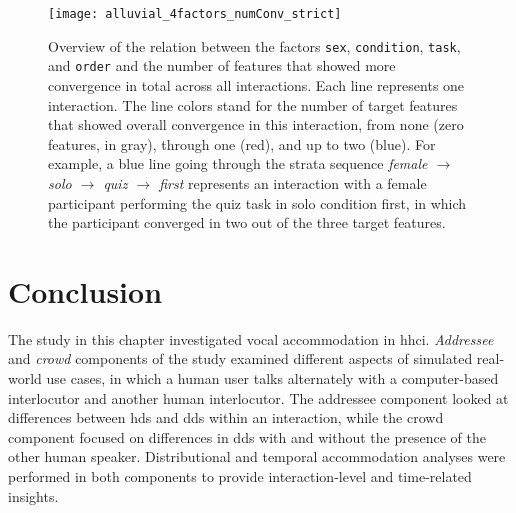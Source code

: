 \begin{figure}[!t]
	\vspace{-0.5cm}
	\centering
	\texttt{[image: alluvial\_4factors\_numConv\_strict]}
	\caption[Number of features showing convergence categorized by factor]
		{Overview of the relation between the factors \texttt{sex}, \texttt{condition}, \texttt{task}, and \texttt{order} and the number of features that showed more convergence in total across all interactions.
		Each line represents one interaction.
		The line colors stand for the number of target features that showed overall convergence in this interaction, from none (zero features, in gray), through one (red), and up to two (blue).
		For example, a blue line going through the strata sequence \emph{female $\rightarrow$ solo $\rightarrow$ quiz $\rightarrow$ first} represents an interaction with a female participant performing the quiz task in solo condition first, in which the participant converged in two out of the three target features.}
	\label{fig:alluvial}
\end{figure}
%
\section{Conclusion}
\label{sec:discussion_hhci}

The study in this chapter investigated vocal accommodation in \acf{hhci}.
\emph{Addressee} and \emph{crowd} components of the study examined different aspects of simulated real-world use cases, in which a human user talks alternately with a computer-based interlocutor and another human interlocutor.
The addressee component looked at differences between \acf{hds} and \acf{dds} within an interaction, while the crowd component focused on differences in \ac{dds} with and without the presence of the other human speaker.
Distributional and temporal accommodation analyses were performed in both components to provide interaction-level and time-related insights.

